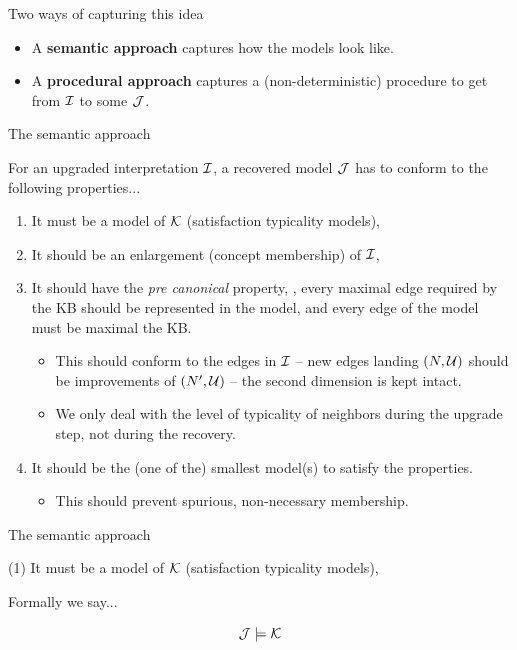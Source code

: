 \documentclass[10pt]{beamer}
\begin{document}
\begin{frame}[fragile]{Two ways of capturing this idea}
  \begin{itemize}
    \item A \textbf{semantic approach} captures how the models look like.
    \item A \textbf{procedural approach} captures a (non-deterministic) procedure to get from $\mathcal{I}$ to some $\mathcal{J}$.
  \end{itemize}
\end{frame}

\begin{frame}[fragile]{The semantic approach}

  For an upgraded interpretation $\mathcal{I}$, a recovered model $\mathcal{J}$ has to conform to the following properties... 

  \begin{enumerate}
    \item It must be a model of $\mathcal{K}$ (satisfaction \wrt typicality models), \pause
    \item It should be an enlargement (\wrt concept membership) of $\mathcal{I}$, \pause
    \item It should have the \emph{pre canonical} property, \ie, every maximal edge required by the KB should be represented in the model, and every edge of the model must be maximal \wrt the KB. \pause
    \begin{itemize}
      \item This should conform to the edges in $\mathcal{I}$ -- new edges landing $(N, \mathcal{U})$ should be improvements of $(N', \mathcal{U})$ -- the second dimension is kept intact.  \pause
      \item We only deal with the level of typicality of neighbors during the upgrade step, not during the recovery. \pause
    \end{itemize}
    \item It should be the (one of the) smallest model(s) to satisfy the properties. \pause
    \begin{itemize}
      \item This should prevent spurious, non-necessary membership. 
    \end{itemize}
\end{enumerate}

\end{frame}

\begin{frame}[fragile]{The semantic approach}

  (1) It must be a model of $\mathcal{K}$ (satisfaction \wrt typicality models), \pause
   

  Formally we say... 

  \begin{equation*}
    \mathcal{J} \models \mathcal{K}
  \end{equation*}

\end{frame}
\end{document}
